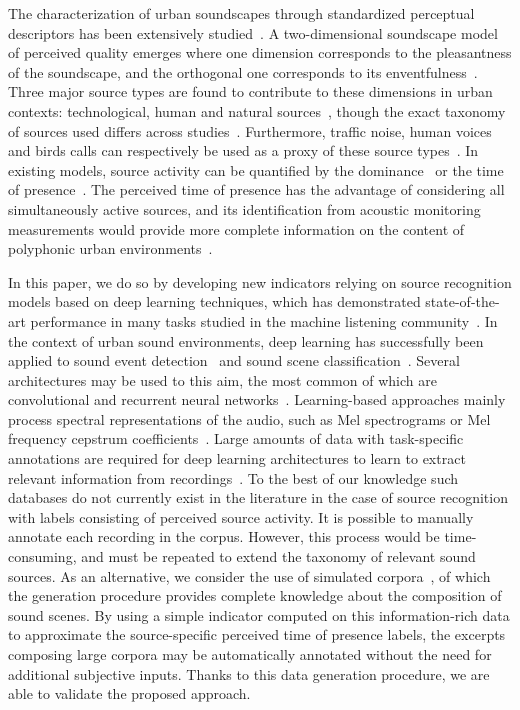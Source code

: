 \documentclass[twocolumn]{article}
\begin{document}
The characterization of urban soundscapes through standardized perceptual descriptors has been extensively studied~\cite{viollon2000, axelsson2010, cain2013, jeon2018, aletta2016}. A two-dimensional soundscape model of perceived quality emerges where one dimension corresponds to the pleasantness of the soundscape, and the orthogonal one corresponds to its enventfulness~\cite{axelsson2010, aumond2017, delaitre2014}. Three major source types are found to contribute to these dimensions in urban contexts: technological, human and natural sources~\cite{nilsson2007, axelsson2010}, though the exact taxonomy of sources used differs across studies~\cite{guastavino2007, gygi2007, brown2011}. Furthermore, traffic noise, human voices and birds calls can respectively be used as a proxy of these source types~\cite{lavandier2006, ricciardi2014, aumond2017}. In existing models, source activity can be quantified by the dominance~\cite{hong2017, axelsson2010} or the time of presence~\cite{ricciardi2014}. The perceived time of presence has the advantage of considering all simultaneously active sources, and its identification from acoustic monitoring measurements would provide more complete information on the content of polyphonic urban environments~\cite{lavandier2016}.

In this paper, we do so by developing new indicators relying on source recognition models based on deep learning techniques, which has demonstrated state-of-the-art performance in many tasks studied in the machine listening community~\cite{mesaros2017}. In the context of urban sound environments, deep learning has successfully been applied to sound event detection~\cite{foggia2015, mcfee2018, adavanne2017} and sound scene classification~\cite{valenti2016, salamon2017-2}. Several architectures may be used to this aim, the most common of which are convolutional and recurrent neural networks~\cite{mesaros2019}. Learning-based approaches mainly process spectral representations of the audio, such as Mel spectrograms or Mel frequency cepstrum coefficients~\cite{barchiesi2015}. Large amounts of data with task-specific annotations are required for deep learning architectures to learn to extract relevant information from recordings~\cite{salamon2014, mesaros2017, gemmeke2017}. To the best of our knowledge such databases do not currently exist in the literature in the case of source recognition with labels consisting of perceived source activity. It is possible to manually annotate each recording in the corpus. However, this process would be time-consuming, and must be repeated to extend the taxonomy of relevant sound sources. As an alternative, we consider the use of simulated corpora~\cite{lafay2016, salamon2017}, of which the generation procedure provides complete knowledge about the composition of sound scenes. By using a simple indicator computed on this information-rich data to approximate the source-specific perceived time of presence labels, the excerpts composing large corpora may be automatically annotated without the need for additional subjective inputs. Thanks to this data generation procedure, we are able to validate the proposed approach.
\end{document}

